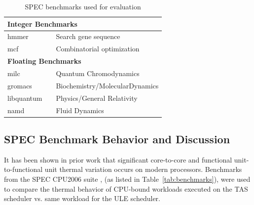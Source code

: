 \documentclass[times, 10pt,twocolumn]{IEEEtran}
\begin{document}
\begin{table}[tpbh]
  \caption{SPEC benchmarks used for evaluation}
  \label{tab:benchmarks} 
\centering
\begin{tabular}{p c p{5cm}} 
\hline 
\hline
\multicolumn{3}{l}{\textbf{Integer Benchmarks}}\\ 
\hline 
hmmer &  & Search gene sequence \\
mcf &  & Combinatorial optimization \\
\hline 
\hline
\multicolumn{3}{l}{\textbf{Floating Benchmarks}}\\ 
\hline 
milc &  & Quantum Chromodynamics \\
gromacs &  & Biochemistry/MolecularDynamics \\
libquantum &  & Physics/General Relativity \\
namd &  & Fluid Dynamics \\
\hline
\end{tabular} %

\end{table}

\subsection{SPEC Benchmark Behavior and Discussion}
\label{sec:microarch} It has been shown in prior work
\cite{Choi2007,Cher2011} that significant core-to-core and functional
unit-to-functional unit thermal variation occurs on modern processors.
Benchmarks from the SPEC CPU2006 suite \cite{Spec2006}, (as listed in
Table~\eqref{tab:benchmarks}), were used to compare the thermal behavior
of CPU-bound workloads executed on the TAS scheduler vs. same workload
for the ULE scheduler.
\end{document}
